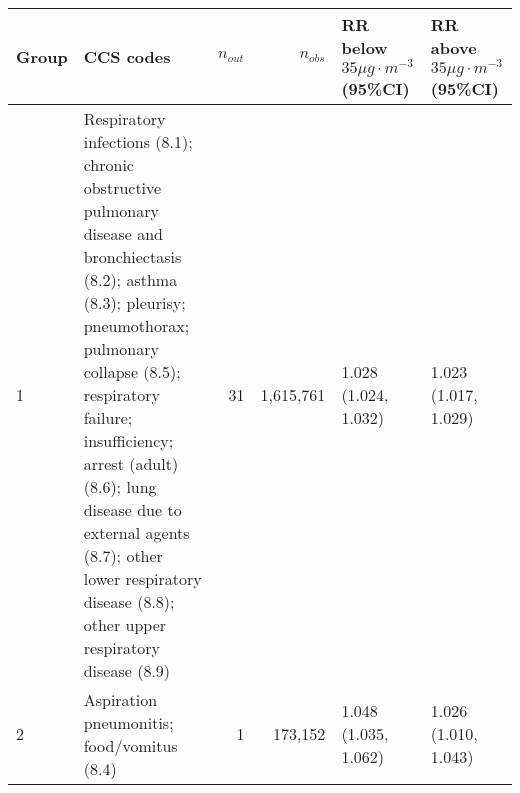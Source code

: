 \begin{tabular}{lp{6.5cm}rrp{2.2cm}p{2.2cm}}
  \hline
Group & CCS codes & $n_{out}$ & $n_{obs}$ & RR below $35 \mu g \cdot m^{-3}$ (95\%CI) & RR above $35 \mu g \cdot m^{-3}$ (95\%CI) \\ 
  \hline
   1 & Respiratory infections (8.1); chronic obstructive pulmonary disease and bronchiectasis (8.2); asthma (8.3); pleurisy; pneumothorax; pulmonary collapse (8.5); respiratory failure; insufficiency; arrest (adult) (8.6); lung disease due to external agents (8.7); other lower respiratory disease (8.8); other upper respiratory disease (8.9) &   31 & 1,615,761 & 1.028 (1.024, 1.032) & 1.023 (1.017, 1.029) \\ 
     2 & Aspiration pneumonitis; food/vomitus (8.4) &    1 & 173,152 & 1.048 (1.035, 1.062) & 1.026 (1.010, 1.043) \\ 
   \hline
\end{tabular}

